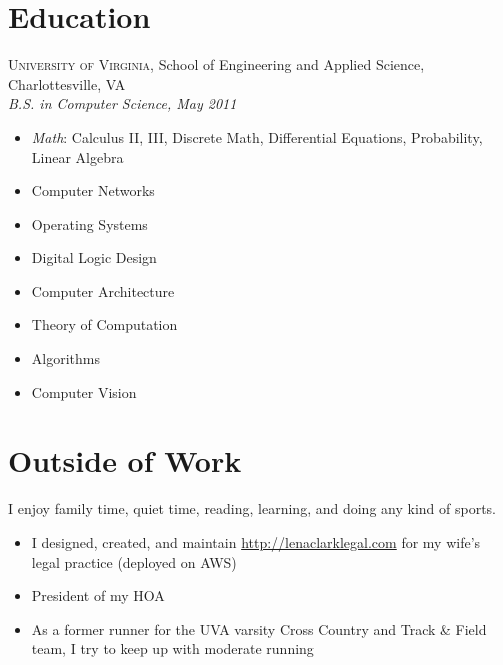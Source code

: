 \documentclass[12pt]{article}
\begin{document}

\section*{Education}

\textsc{University of Virginia}, School of Engineering and Applied Science,
Charlottesville, VA \\
\textit{B.S. in Computer Science, May 2011}

\begin{multicols}{3}
  \raggedright
  \begin{itemize}
  \item \textit{Math}: Calculus II, III, Discrete Math, Differential
    Equations, Probability, Linear Algebra
  \item Computer Networks
  \item Operating Systems
  \item Digital Logic Design
  \item Computer Architecture
  \item Theory of Computation
  \item Algorithms
  \item Computer Vision
  \end{itemize}
\end{multicols}


\section*{Outside of Work}

I enjoy family time, quiet time, reading, learning, and doing any kind of
sports.

\begin{itemize}
\item I designed, created, and maintain \url{http://lenaclarklegal.com} for my
  wife's legal practice (deployed on AWS)
\item President of my HOA
\item As a former runner for the UVA varsity Cross Country and Track \& Field
  team, I try to keep up with moderate running
\end{itemize}
\end{document}
